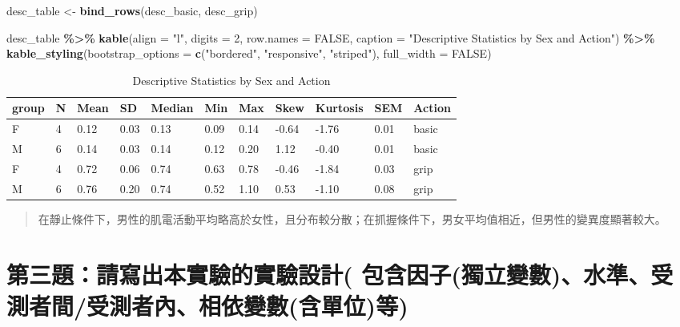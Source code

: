 \documentclass[
  12pt,
]{article}
\newenvironment{Shaded}{\begin{snugshade}}{\end{snugshade}}
\newcommand{\AttributeTok}[1]{\textcolor[rgb]{0.13,0.29,0.53}{#1}}
\newcommand{\ConstantTok}[1]{\textcolor[rgb]{0.56,0.35,0.01}{#1}}
\newcommand{\DecValTok}[1]{\textcolor[rgb]{0.00,0.00,0.81}{#1}}
\newcommand{\FunctionTok}[1]{\textcolor[rgb]{0.13,0.29,0.53}{\textbf{#1}}}
\newcommand{\NormalTok}[1]{#1}
\newcommand{\OtherTok}[1]{\textcolor[rgb]{0.56,0.35,0.01}{#1}}
\newcommand{\SpecialCharTok}[1]{\textcolor[rgb]{0.81,0.36,0.00}{\textbf{#1}}}
\newcommand{\StringTok}[1]{\textcolor[rgb]{0.31,0.60,0.02}{#1}}
\begin{document}
\begin{Shaded}
\begin{Highlighting}[]
\NormalTok{desc\_table }\OtherTok{\textless{}{-}} \FunctionTok{bind\_rows}\NormalTok{(desc\_basic, desc\_grip)}

\NormalTok{desc\_table }\SpecialCharTok{\%\textgreater{}\%}
  \FunctionTok{kable}\NormalTok{(}\AttributeTok{align =} \StringTok{"l"}\NormalTok{, }\AttributeTok{digits =} \DecValTok{2}\NormalTok{, }\AttributeTok{row.names =} \ConstantTok{FALSE}\NormalTok{,}
        \AttributeTok{caption =} \StringTok{"Descriptive Statistics by Sex and Action"}\NormalTok{) }\SpecialCharTok{\%\textgreater{}\%}
  \FunctionTok{kable\_styling}\NormalTok{(}\AttributeTok{bootstrap\_options =} \FunctionTok{c}\NormalTok{(}\StringTok{"bordered"}\NormalTok{, }\StringTok{"responsive"}\NormalTok{, }\StringTok{"striped"}\NormalTok{), }\AttributeTok{full\_width =} \ConstantTok{FALSE}\NormalTok{)}
\end{Highlighting}
\end{Shaded}

\begin{longtable}[t]{lllllllllll}
\caption{\label{tab:describeBy-sex-table}Descriptive Statistics by Sex and Action}\\
\toprule
group & N & Mean & SD & Median & Min & Max & Skew & Kurtosis & SEM & Action\\
\midrule
F & 4 & 0.12 & 0.03 & 0.13 & 0.09 & 0.14 & -0.64 & -1.76 & 0.01 & basic\\
M & 6 & 0.14 & 0.03 & 0.14 & 0.12 & 0.20 & 1.12 & -0.40 & 0.01 & basic\\
F & 4 & 0.72 & 0.06 & 0.74 & 0.63 & 0.78 & -0.46 & -1.84 & 0.03 & grip\\
M & 6 & 0.76 & 0.20 & 0.74 & 0.52 & 1.10 & 0.53 & -1.10 & 0.08 & grip\\
\bottomrule
\end{longtable}

\begin{quote}
在靜止條件下，男性的肌電活動平均略高於女性，且分布較分散；在抓握條件下，男女平均值相近，但男性的變異度顯著較大。
\end{quote}

\section{第三題：請寫出本實驗的實驗設計(
包含因子(獨立變數)、水準、受測者間/受測者內、相依變數(含單位)等)}\label{ux7b2cux4e09ux984cux8acbux5bebux51faux672cux5be6ux9a57ux7684ux5be6ux9a57ux8a2dux8a08-ux5305ux542bux56e0ux5b50ux7368ux7acbux8b8aux6578ux6c34ux6e96ux53d7ux6e2cux8005ux9593ux53d7ux6e2cux8005ux5167ux76f8ux4f9dux8b8aux6578ux542bux55aeux4f4dux7b49}
\end{document}
